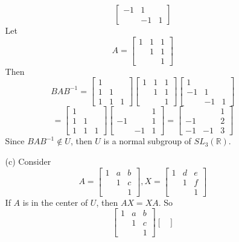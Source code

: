 \begin{itemize}
\begin{itemize}
$$\begin{bmatrix}
-1 & 1 \\
& -1 & 1
\end{bmatrix}$$
Let
$$A = \begin{bmatrix}
1 & 1 & 1 \\
& 1 & 1 \\
& & 1
\end{bmatrix}$$
Then
$$BAB^{-1} = \begin{bmatrix}
1 \\
1 & 1 \\
1 & 1 & 1
\end{bmatrix}\begin{bmatrix}
1 & 1 & 1 \\
& 1 & 1 \\
& & 1
\end{bmatrix}\begin{bmatrix}
1 & \\
-1 & 1 \\
& -1 & 1
\end{bmatrix}$$
$$= \begin{bmatrix}
1 \\
1 & 1 \\
1 & 1 & 1
\end{bmatrix}\begin{bmatrix}
& & 1 \\
-1 & & 1 \\
& -1 & 1
\end{bmatrix} = \begin{bmatrix}
& & 1 \\
-1 & & 2 \\
-1 & -1 & 3
\end{bmatrix}$$
Since $BAB^{-1} \not \in U$, then $U$ is a normal subgroup of $SL_3(\mathbb{R})$.
\item[(c)]
Consider
$$A = \begin{bmatrix}
1 & a & b \\
& 1 & c \\
& & 1
\end{bmatrix}, X = \begin{bmatrix}
1 & d & e \\
& 1 & f \\
& & 1
\end{bmatrix}$$
If $A$ is in the center of $U$, then $AX = XA$. So
$$\begin{bmatrix}
1 & a & b \\
& 1 & c \\
& & 1
\end{bmatrix}\begin{bmatrix}

\end{bmatrix}$$
\end{itemize}
\end{itemize}

